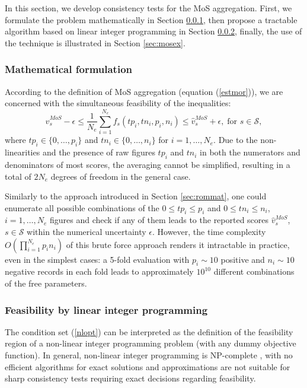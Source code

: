 \documentclass[5p, final]{elsarticle}
\begin{document}
In this section, we develop consistency tests for the MoS aggregation. First, we formulate the problem mathematically in Section \ref{sec:mosmath}, then propose a tractable algorithm based on linear integer programming in Section \ref{sec:moslinprog}, finally, the use of the technique is illustrated in Section \ref{sec:mosex}.

\subsubsection{Mathematical formulation}
\label{sec:mosmath}
According to the definition of MoS aggregation (equation (\ref{estmor})), we are concerned with the simultaneous feasibility of the inequalities:
\begin{equation}
\label{nlopt}
\hat{v}_s^{MoS} - \epsilon \leq \dfrac{1}{N_e}\sum\limits_{i=1}^{N_e} f_s(tp_i, tn_i, p_i, n_i) \leq \hat{v}_s^{MoS} + \epsilon, \; \text{for } s \in \mathcal{S},
\end{equation}
where $tp_i \in \lbrace 0, \dots, p_i\rbrace$ and $tn_i \in \lbrace 0, \dots, n_i\rbrace$ for $i = 1, \dots, N_e$. Due to the non-linearities and the presence of raw figures $tp_i$ and $tn_i$ in both the numerators and denominators of most scores, the averaging cannot be simplified, resulting in a total of $2N_e$ degrees of freedom in the general case.

Similarly to the approach introduced in Section \ref{sec:rommat}, one could enumerate all possible combinations of the $0 \leq tp_i \leq p_i$ and $0 \leq tn_i \leq n_i$, $i=1, \dots, N_e$ figures and check if any of them leads to the reported scores $\hat{v}_s^{MoS}$, $s\in\mathcal{S}$ within the numerical uncertainty $\epsilon$. However, the time complexity $O\left(\prod_{i=1}^{N_e}p_in_i\right)$ of this brute force approach renders it intractable in practice, even in the simplest cases: a 5-fold evaluation with $p_i\sim 10$ positive and $n_i\sim 10$ negative records in each fold leads to approximately $10^{10}$ different combinations of the free parameters. 

\subsubsection{Feasibility by linear integer programming}
\label{sec:moslinprog}

The condition set (\ref{nlopt}) can be interpreted as the definition of the feasibility region of a non-linear integer programming problem (with any dummy objective function). In general, non-linear integer programming is NP-complete \cite{ip}, with no efficient algorithms for exact solutions and approximations are not suitable for sharp consistency tests requiring exact decisions regarding feasibility. 
\end{document}
